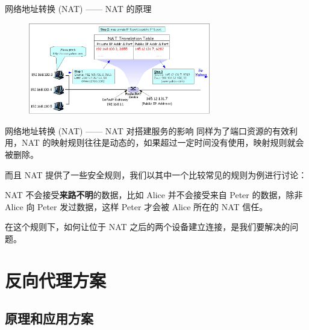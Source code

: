 \begin{xframe}{网络地址转换 (NAT) —— NAT 的原理}
	\begin{figure}[h]
		\includegraphics[width=300px]{Network_Address_Translation.jpg}
	\end{figure}
\end{xframe}

\begin{xframe}{网络地址转换 (NAT) —— NAT 对搭建服务的影响}
	同样为了端口资源的有效利用，NAT 的映射规则往往是动态的，如果超过一定时间没有使用，映射规则就会被删除。\pause
	
	而且 NAT 提供了一些安全规则，我们以其中一个比较常见的规则为例进行讨论：
	
	NAT 不会接受\textbf{来路不明}的数据，比如 Alice 并不会接受来自 Peter 的数据，除非 Alice 向 Peter 发过数据，这样 Peter 才会被 Alice 所在的 NAT 信任。\pause

	在这个规则下，如何让位于 NAT 之后的两个设备建立连接，是我们要解决的问题。
\end{xframe}


\section{反向代理方案}

\subsection{原理和应用方案}

